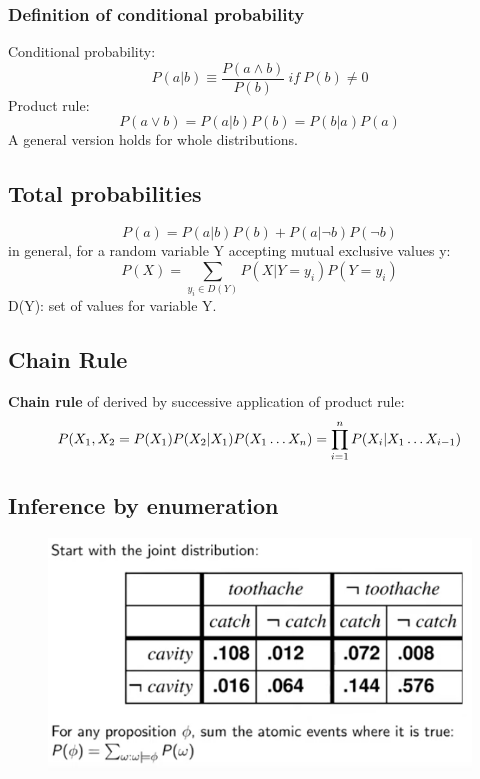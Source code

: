 \subsubsection{Definition of conditional probability}
Conditional probability:
\begin{equation}
    P(a|b) \equiv \frac{P(a \land b)}{P(b)}\ if\ P(b) \neq 0
\end{equation}
Product rule:
\begin{equation}
    P(a \lor b) = P(a|b)P(b) = P(b|a)P(a)
\end{equation}
A general version holds for whole distributions.
\subsection{Total probabilities}

\begin{equation}
    P(a) = P(a|b)P(b) + P(a|\neg b)P(\neg b)
\end{equation}
in general, for a random variable Y accepting mutual exclusive values y:
\begin{equation}
    P(X) = \sum_{y_{i} \in D(Y)} P(X|Y=y_{i})P(Y=y_{i})
\end{equation}
D(Y): set of values for variable Y.

\subsection{Chain Rule}
\textbf{Chain rule} of derived by successive application of product rule:
\begin{equation}
    P(X_{1}, X_{2} = P(X_{1})P(X_{2}|X_{1}) \\
    P(X_{1} \dots X_{n}) = \prod_{i=1}^{n}P(X_{i}|X_{1}\dots X_{i-1})
\end{equation}

\subsection{Inference by enumeration}
\begin{figure}[H]
    \centering
    \includegraphics[width=12cm]{images/Probabilities/Inference_by_enum.png}
    \caption{}
    \label{fig:infbyenum}
\end{figure}

